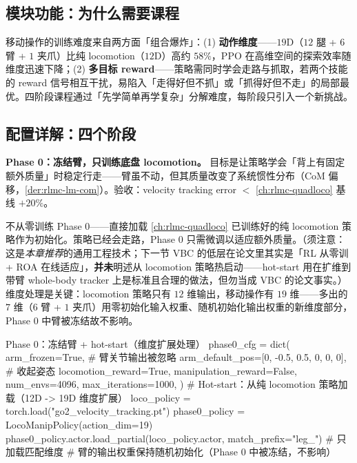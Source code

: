 \subsection{模块功能：为什么需要课程}
\label{sec:rlmc-lm-curr-why}

移动操作的训练难度来自两方面「组合爆炸」：(1) \textbf{动作维度}——$19$D（$12$ 腿 + $6$ 臂 + $1$ 夹爪）比纯 locomotion（$12$D）高约 $58\%$，PPO 在高维空间的探索效率随维度迅速下降；(2) \textbf{多目标 reward}——策略需同时学会走路与抓取，若两个技能的 reward 信号相互干扰，易陷入「走得好但不抓」或「抓得好但不走」的局部最优。四阶段课程通过「先学简单再学复杂」分解难度，每阶段只引入一个新挑战。

\subsection{配置详解：四个阶段}
\label{sec:rlmc-lm-curr-phases}

\textbf{Phase 0：冻结臂，只训练底盘 locomotion。} 目标是让策略学会「背上有固定额外质量」时稳定行走——臂虽不动，但其质量改变了系统惯性分布（CoM 偏移，\cref{der:rlmc-lm-com}）。验收：velocity tracking error $<$ \cref{ch:rlmc-quadloco} 基线 $+20\%$。

\begin{insight}\label{ins:rlmc-lm-hotstart}
不从零训练 Phase 0——直接加载 \cref{ch:rlmc-quadloco} 已训练好的纯 locomotion 策略作为初始化。策略已经会走路，Phase 0 只需微调以适应额外质量。（须注意：这是\emph{本章推荐}的通用工程技术；下一节 VBC 的低层在论文里其实是「RL 从零训 + ROA 在线适应」，\textbf{并未}明述从 locomotion 策略热启动——hot-start 用在扩维到带臂 whole-body tracker 上是标准且合理的做法，但勿当成 VBC 的论文事实。）维度处理是关键：locomotion 策略只有 $12$ 维输出，移动操作有 $19$ 维——多出的 $7$ 维（$6$ 臂 + $1$ 夹爪）用零初始化输入权重、随机初始化输出权重的新维度部分，Phase 0 中臂被冻结故不影响。
\end{insight}

\begin{codebox}[Python]{Phase 0：冻结臂 + hot-start（维度扩展处理）}
phase0_cfg = dict(
    arm_frozen=True,                              # 臂关节输出被忽略
    arm_default_pos=[0, -0.5, 0.5, 0, 0, 0],      # 收起姿态
    locomotion_reward=True, manipulation_reward=False,
    num_envs=4096, max_iterations=1000,
)
# Hot-start：从纯 locomotion 策略加载（12D -> 19D 维度扩展）
loco_policy = torch.load("go2_velocity_tracking.pt")
phase0_policy = LocoManipPolicy(action_dim=19)
phase0_policy.actor.load_partial(loco_policy.actor, match_prefix="leg_")  # 只加载匹配维度
# 臂的输出权重保持随机初始化（Phase 0 中被冻结，不影响）
\end{codebox}

